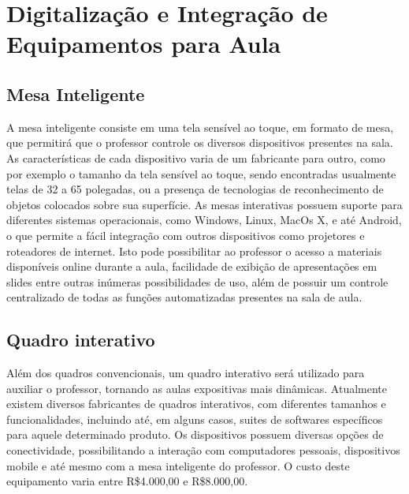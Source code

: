 \section{Digitalização e Integração de Equipamentos para Aula}

\subsection{Mesa Inteligente}

A mesa inteligente consiste em uma tela sensível ao toque, em formato de mesa, que permitirá que o professor controle os diversos dispositivos presentes na sala.
As características de cada dispositivo varia de um fabricante para outro, como por exemplo o tamanho da tela sensível ao toque, sendo encontradas usualmente telas de 32 a 65 polegadas, ou a presença de tecnologias de reconhecimento de objetos colocados sobre sua superfície.
As mesas interativas possuem suporte para diferentes sistemas operacionais, como Windows, Linux, MacOs X, e até Android, o que permite a fácil integração com outros dispositivos como projetores e roteadores de internet. Isto pode possibilitar ao professor o acesso a materiais disponíveis online durante a aula, facilidade de exibição de apresentações em slides entre outras inúmeras possibilidades de uso, além de possuir um controle centralizado de todas as funções automatizadas presentes na sala de aula.

\subsection{Quadro interativo}

Além dos quadros convencionais, um quadro interativo será utilizado para auxiliar o professor, tornando as aulas expositivas mais dinâmicas. Atualmente existem diversos fabricantes de quadros interativos, com diferentes tamanhos e funcionalidades, incluindo até, em alguns casos, suites de softwares específicos para aquele determinado produto. Os dispositivos possuem diversas opções de conectividade, possibilitando a interação com computadores pessoais, dispositivos mobile e até mesmo com a mesa inteligente do professor. O custo deste equipamento varia entre R\$4.000,00 e R\$8.000,00.

